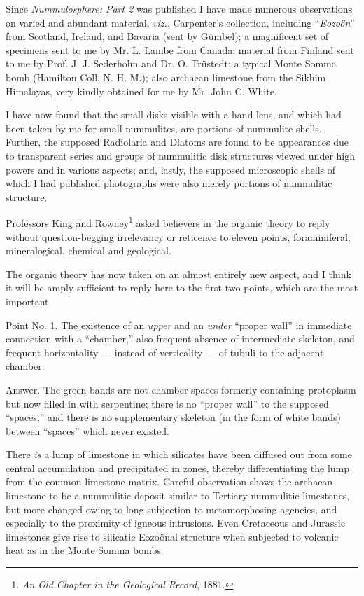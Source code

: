 \documentclass[a4paper, 12pt, oneside]{article}
\begin{document}
Since \emph{Nummulosphere: Part 2} was published I have made numerous observations on varied and abundant material, \emph{viz.}, Carpenter's collection, including ``\emph{Eozoön}'' from Scotland, Ireland, and Bavaria (sent by Gümbel); a magnificent set of specimens sent to me by Mr. L. Lambe from Canada; material from Finland sent to me by Prof. J. J. Sederholm and Dr. O. Trüstedt; a typical Monte Somma bomb (Hamilton Coll. N. H. M.); also archaean limestone from the Sikhim Himalayas, very kindly obtained for me by Mr. John C. White.

I have now found that the small disks visible with a hand lens, and which had been taken by me for small nummulites, are portions of nummulite shells. Further, the supposed Radiolaria and Diatoms are found to be appearances due to transparent series and groups of nummulitic disk structures viewed under high powers and in various aspects; and, lastly, the supposed microscopic shells of which I had published photographs were also merely portions of nummulitic structure.

Professors King and Rowney\footnote{\emph{An Old Chapter in the Geological Record}, 1881.} asked believers in the organic theory to reply without question-begging irrelevancy or reticence to eleven points, foraminiferal, mineralogical, chemical and geological.

The organic theory has now taken on an almost entirely new aspect, and I think it will be amply sufficient to reply here to the first two points, which are the most important.

Point No. 1. The existence of an \emph{upper} and an \emph{under} ``proper wall'' in immediate connection with a ``chamber,'' also frequent absence of intermediate skeleton, and frequent horizontality --- instead of verticality --- of tubuli to the adjacent chamber.

Answer. The green bands are not chamber-spaces formerly containing protoplasm but now filled in with serpentine; there is no ``proper wall'' to the supposed ``spaces,'' and there is no supplementary skeleton (in the form of white bands) between ``spaces'' which never existed.

There \emph{is} a lump of limestone in which silicates have been diffused out from some central accumulation and precipitated in zones, thereby differentiating the lump from the common limestone matrix. Careful observation shows the archaean limestone to be a nummulitic deposit similar to Tertiary nummulitic limestones, but more changed owing to long subjection to metamorphosing agencies, and especially to the proximity of igneous intrusions. Even Cretaceous and Jurassic limestones give rise to silicatic Eozoönal structure when subjected to volcanic heat as in the Monte Somma bombs.
\end{document}

